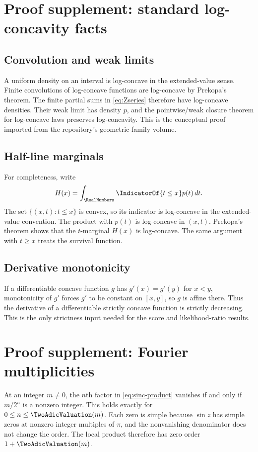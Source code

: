 \documentclass[11pt,oneside]{article}
\theoremstyle{definition}
\theoremstyle{remark}
\begin{document}
\appendix

\section{Proof supplement: standard log-concavity facts}

\subsection{Convolution and weak limits}
A uniform density on an interval is log-concave in the extended-value sense.
Finite convolutions of log-concave functions are log-concave by Prekopa's theorem.
The finite partial sums in \eqref{eq:Zseries} therefore have log-concave densities.
Their weak limit has density $p$, and the pointwise/weak closure theorem for
log-concave laws preserves log-concavity.  This is the conceptual proof imported
from the repository's geometric-family volume.

\subsection{Half-line marginals}
For completeness, write
\[
 H(x)=\int_{\RealNumbers}\IndicatorOf{t\le x}p(t)\,dt.
\]
The set $\{(x,t):t\le x\}$ is convex, so its indicator is log-concave in the
extended-value convention.  The product with $p(t)$ is log-concave in $(x,t)$.
Prekopa's theorem shows that the $t$-marginal $H(x)$ is log-concave.  The same
argument with $t\ge x$ treats the survival function.

\subsection{Derivative monotonicity}
If a differentiable concave function $g$ has $g'(x)=g'(y)$ for $x<y$, monotonicity
of $g'$ forces $g'$ to be constant on $[x,y]$, so $g$ is affine there.  Thus the
derivative of a differentiable strictly concave function is strictly decreasing.
This is the only strictness input needed for the score and likelihood-ratio
results.

\section{Proof supplement: Fourier multiplicities}
At an integer $m\ne0$, the $n$th factor in \eqref{eq:sinc-product} vanishes if and
only if $m/2^n$ is a nonzero integer.  This holds exactly for
$0\le n\le\TwoAdicValuation(m)$.  Each zero is simple because $\sin z$ has simple zeros at
nonzero integer multiples of $\pi$, and the nonvanishing denominator does not
change the order.  The local product therefore has zero order $1+\TwoAdicValuation(m)$.
\end{document}
